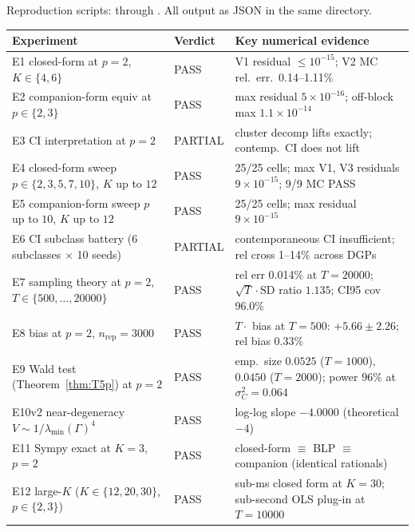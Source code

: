\documentclass[11pt,letterpaper]{article}
\theoremstyle{remark}
\newcommand{\sigC}{\sigma^2_C}
\begin{document}
Reproduction scripts:  through . All output as JSON in the same directory.

\begin{center}
\small
\begin{tabular}{lll}
\toprule
Experiment & Verdict & Key numerical evidence \\
\midrule
E1 closed-form at $p=2$, $K \in \{4, 6\}$            & PASS  & V1 residual $\le 10^{-15}$; V2 MC rel.\ err.\ 0.14--1.11\% \\
E2 companion-form equiv at $p \in \{2, 3\}$          & PASS  & max residual $5 \times 10^{-16}$; off-block max $1.1 \times 10^{-14}$ \\
E3 CI interpretation at $p=2$                        & PARTIAL & cluster decomp lifts exactly; contemp.\ CI does not lift \\
E4 closed-form sweep $p \in \{2,3,5,7,10\}$, $K$ up to $12$ & PASS  & 25/25 cells; max V1, V3 residuals $9 \times 10^{-15}$; 9/9 MC PASS \\
E5 companion-form sweep $p$ up to $10$, $K$ up to $12$ & PASS  & 25/25 cells; max residual $9 \times 10^{-15}$ \\
E6 CI subclass battery (6 subclasses $\times$ 10 seeds) & PARTIAL & contemporaneous CI insufficient; rel cross 1--14\% across DGPs \\
E7 sampling theory at $p=2$, $T \in \{500, \ldots, 20000\}$ & PASS & rel err 0.014\% at $T=20000$; $\sqrt{T}\!\cdot\!\mathrm{SD}$ ratio $1.135$; CI95 cov 96.0\% \\
E8 bias at $p=2$, $n_{\mathrm{rep}} = 3000$         & PASS  & $T \cdot$ bias at $T=500$: $+5.66 \pm 2.26$; rel bias $0.33\%$ \\
E9 Wald test (Theorem~\ref{thm:T5p}) at $p=2$       & PASS  & emp.\ size $0.0525$ ($T=1000$), $0.0450$ ($T=2000$); power $96\%$ at $\sigC = 0.064$ \\
E10v2 near-degeneracy $V \sim 1/\lambda_{\min}(\Gamma)^4$ & PASS  & log-log slope $\mathbf{-4.0000}$ (theoretical $-4$) \\
E11 Sympy exact at $K=3$, $p=2$                     & PASS  & closed-form $\equiv$ BLP $\equiv$ companion (identical rationals) \\
E12 large-$K$ ($K \in \{12, 20, 30\}$, $p \in \{2, 3\}$) & PASS  & sub-ms closed form at $K=30$; sub-second OLS plug-in at $T=10000$ \\
\bottomrule
\end{tabular}
\end{center}
\end{document}
